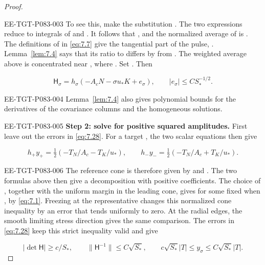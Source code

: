 \begin{proof}
\begin{EESegment}{EE-TGT-P083-003}
To see this, make the substitution . The two expressions reduce to integrals of  and . It follows that , and the normalized  average of  is . The definitions of  in \eqref{eq:7.7} give the tangential part of the pulse, . Lemma~\ref{lem:7.4} says that its ratio to  differs by  from . The weighted average above is concentrated near , where . Set . Then
\end{EESegment}
\begin{equation}
  \mathsf H_\sigma=h_\sigma(-A_cN-\sigma u_*K+e_\sigma),
  \qquad |e_\sigma|\leq CS_*^{-1/2}.
  \tag{7.28}\label{eq:7.28}
\end{equation}
\begin{EESegment}{EE-TGT-P083-004}
Lemma~\ref{lem:7.4} also gives polynomial bounds for the derivatives of the covariance columns and the homogeneous solutions.
\end{EESegment}

\begin{EESegment}{EE-TGT-P083-005}
\textbf{Step 2: solve for positive squared amplitudes.}
First leave out the errors  in \eqref{eq:7.28}. For a target , the two scalar equations then give
\end{EESegment}
\[
  h_+y_+=\tfrac12(-T_N/A_c-T_K/u_*),
  \qquad
  h_-y_-=\tfrac12(-T_N/A_c+T_K/u_*).
\]
\begin{EESegment}{EE-TGT-P083-006}
The reference cone is therefore given by  and . The two formulas above then give a decomposition with positive coefficients. The choice of , together with the uniform margin in the leading cone, gives  for some fixed  when , by \eqref{eq:7.1}. Freezing  at the representative changes this normalized cone inequality by an error that tends uniformly to zero. At the radial edges, the smooth limiting stress direction gives the same comparison. The errors in \eqref{eq:7.28} keep this strict inequality valid and give
\end{EESegment}
\begin{equation}
  |\det\mathsf H|\geq c/S_*,
  \qquad \lVert\mathsf H^{-1}\rVert\leq C\sqrt{S_*},
  \qquad c\sqrt{S_*}|T|\leq y_\sigma\leq C\sqrt{S_*}|T|.
  \tag{7.29}\label{eq:7.29}
\end{equation}


\end{proof}
